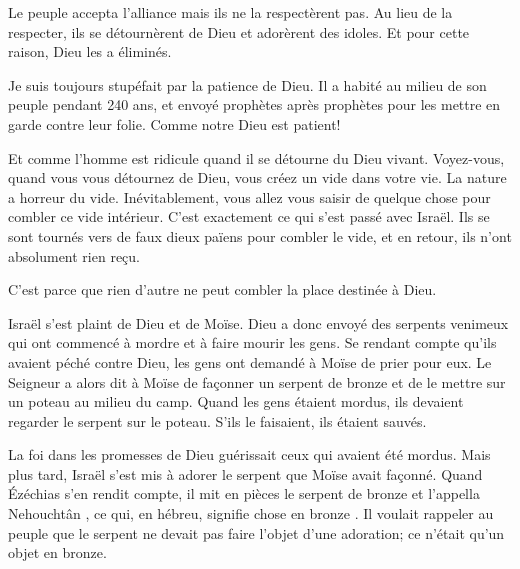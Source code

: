 Le peuple accepta l'alliance \ocadr mais ils ne la respectèrent pas.
 Au lieu de la respecter, ils se détournèrent de Dieu
 et adorèrent des idoles. Et pour cette raison, Dieu les a éliminés. 


Je suis toujours stupéfait par la patience de Dieu.
 Il a habité au milieu de son peuple pendant 240 ans,
 et envoyé prophètes après prophètes pour les mettre en garde
 contre leur folie. Comme notre Dieu est patient! 

Et comme l'homme est ridicule quand il se détourne du Dieu vivant.
 Voyez-vous, quand vous vous détournez de Dieu,
 vous créez un vide dans votre vie. La nature a horreur du vide.
 Inévitablement, vous allez vous saisir de quelque chose pour combler
 ce vide intérieur. C'est exactement ce qui s'est passé avec Israël.
 Ils se sont tournés vers de faux dieux païens pour combler le vide,
 et en retour, ils n'ont absolument rien reçu. 

C'est parce que rien d'autre ne peut combler la place destinée à Dieu. 

\dvrule






 Israël s'est plaint
 de Dieu et de Moïse.
 Dieu a donc envoyé des serpents venimeux qui ont commencé à mordre
 et à faire mourir les gens.
 Se rendant compte qu'ils avaient péché contre Dieu,
 les gens ont demandé à Moïse de prier pour eux.
 Le Seigneur a alors dit à Moïse de façonner un serpent de bronze
 et de le mettre sur un poteau au milieu du camp.
 Quand les gens étaient mordus, ils devaient regarder le serpent
 sur le poteau. S'ils le faisaient, ils étaient sauvés. 

La foi dans les promesses de Dieu guérissait ceux qui avaient été mordus.
 Mais plus tard, Israël s'est mis à adorer le serpent
 que Moïse avait façonné. Quand Ézéchias s'en rendit compte,
 il mit en pièces le serpent de bronze et l'appella \og Nehouchtân \fg{},
 ce qui, en hébreu, signifie \og chose en bronze \fg{}.
 Il voulait rappeler au peuple que le serpent ne devait pas faire
 l'objet d'une adoration; ce n'était qu'un objet en bronze. 

